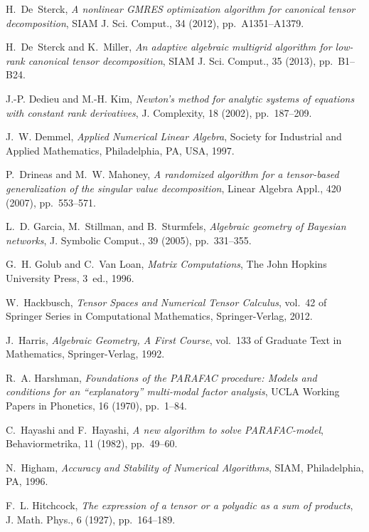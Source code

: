 \documentclass[a4paper,10pt,final]{siamart1116}
\numberwithin{equation}{section}
\numberwithin{figure}{section}
\numberwithin{table}{section}
\numberwithin{theorem}{section}
\begin{document}
\begin{thebibliography}{10}
{\sc H.~De~Sterck}, {\em A nonlinear {GMRES} optimization algorithm for
  canonical tensor decomposition}, SIAM J. Sci. Comput., 34 (2012),
  pp.~A1351--A1379.

{\sc H.~De~Sterck and K.~Miller}, {\em An adaptive algebraic multigrid
  algorithm for low-rank canonical tensor decomposition}, SIAM J. Sci. Comput.,
  35 (2013), pp.~B1--B24.

{\sc J.-P. Dedieu and M.-H. Kim}, {\em {Newton}'s method for analytic systems
  of equations with constant rank derivatives}, J. Complexity, 18 (2002),
  pp.~187--209.

{\sc J.~W. Demmel}, {\em {Applied Numerical Linear Algebra}}, Society for
  Industrial and Applied Mathematics, Philadelphia, PA, USA, 1997.

{\sc P.~Drineas and M.~W. Mahoney}, {\em A randomized algorithm for a
  tensor-based generalization of the singular value decomposition}, Linear
  Algebra Appl., 420 (2007), pp.~553--571.

{\sc L.~D. Garcia, M.~Stillman, and B.~Sturmfels}, {\em Algebraic geometry of
  {Bayesian} networks}, J. Symbolic Comput., 39 (2005), pp.~331--355.

{\sc G.~H. Golub and C.~{Van Loan}}, {\em {Matrix Computations}}, The John
  Hopkins University Press, 3~ed., 1996.

{\sc W.~Hackbusch}, {\em {Tensor Spaces and Numerical Tensor Calculus}},
  vol.~42 of Springer Series in Computational Mathematics, Springer-Verlag,
  2012.

{\sc J.~Harris}, {\em {Algebraic Geometry, A First Course}}, vol.~133 of
  Graduate Text in Mathematics, Springer-Verlag, 1992.

{\sc R.~A. Harshman}, {\em Foundations of the {PARAFAC} procedure: {Models} and
  conditions for an ``explanatory'' multi-modal factor analysis}, UCLA Working
  Papers in Phonetics, 16 (1970), pp.~1--84.

{\sc C.~Hayashi and F.~Hayashi}, {\em A new algorithm to solve
  {PARAFAC}-model}, Behaviormetrika, 11 (1982), pp.~49--60.

{\sc N.~Higham}, {\em Accuracy and Stability of Numerical Algorithms}, SIAM,
  Philadelphia, PA, 1996.

{\sc F.~L. Hitchcock}, {\em The expression of a tensor or a polyadic as a sum
  of products}, J. Math. Phys., 6 (1927), pp.~164--189.


\end{thebibliography}
\end{document}
